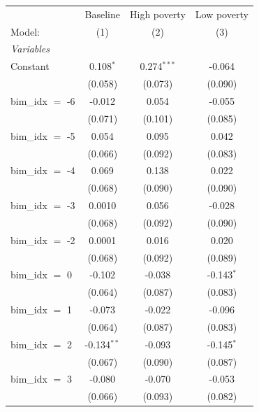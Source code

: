 
\begingroup
\centering
\begin{tabular}{lccc}
   \tabularnewline \midrule \midrule
                       & Baseline       & High poverty   & Low poverty \\   
   Model:              & (1)            & (2)            & (3)\\  
   \midrule
   \emph{Variables}\\
   Constant            & 0.108$^{*}$    & 0.274$^{***}$  & -0.064\\   
                       & (0.058)        & (0.073)        & (0.090)\\   
   bim\_idx $=$ -6     & -0.012         & 0.054          & -0.055\\   
                       & (0.071)        & (0.101)        & (0.085)\\   
   bim\_idx $=$ -5     & 0.054          & 0.095          & 0.042\\   
                       & (0.066)        & (0.092)        & (0.083)\\   
   bim\_idx $=$ -4     & 0.069          & 0.138          & 0.022\\   
                       & (0.068)        & (0.090)        & (0.090)\\   
   bim\_idx $=$ -3     & 0.0010         & 0.056          & -0.028\\   
                       & (0.068)        & (0.092)        & (0.090)\\   
   bim\_idx $=$ -2     & 0.0001         & 0.016          & 0.020\\   
                       & (0.068)        & (0.092)        & (0.089)\\   
   bim\_idx $=$ 0      & -0.102         & -0.038         & -0.143$^{*}$\\   
                       & (0.064)        & (0.087)        & (0.083)\\   
   bim\_idx $=$ 1      & -0.073         & -0.022         & -0.096\\   
                       & (0.064)        & (0.087)        & (0.083)\\   
   bim\_idx $=$ 2      & -0.134$^{**}$  & -0.093         & -0.145$^{*}$\\   
                       & (0.067)        & (0.090)        & (0.087)\\   
   bim\_idx $=$ 3      & -0.080         & -0.070         & -0.053\\   
                       & (0.066)        & (0.093)        & (0.082)\\   

\end{tabular}
